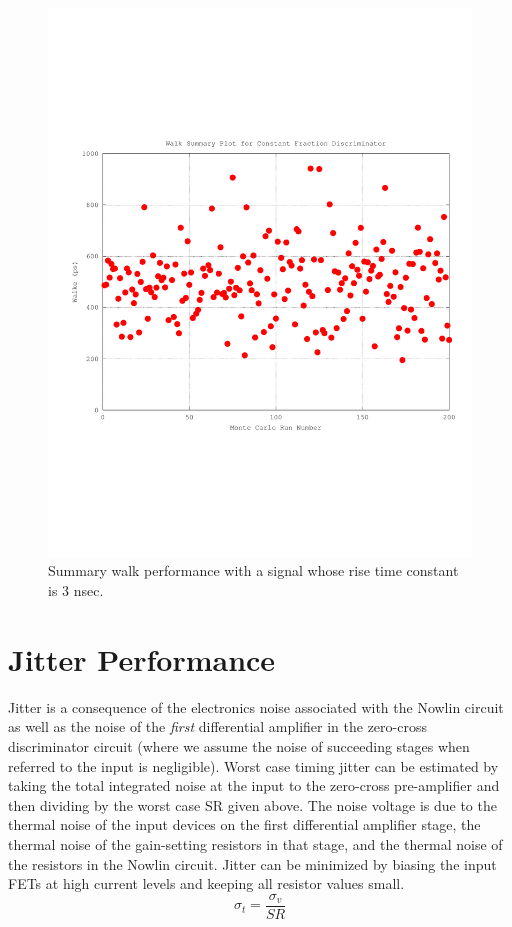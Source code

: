 \documentclass[12pt,oneside,final]{siuethesis}
\theoremstyle{definition}
\begin{document}
\begin{figure}[htbp!]
	\centering
 	\includegraphics[scale=0.8,keepaspectratio=true]{../Design_Reports/CFD_circuit_report/images/summary_walk.pdf} 	
 	\caption{Summary walk performance with a signal whose rise time constant is 3 nsec.}
 	\label{FIG:SUMMARY_WALK}
\end{figure}

\section{Jitter Performance}
\par Jitter is a consequence of the electronics noise associated with the Nowlin circuit as well as the noise of the \emph{first} differential amplifier in the zero-cross discriminator circuit (where we assume the noise of succeeding stages when referred to the input is negligible). Worst case timing jitter can be estimated by taking the total integrated noise at the input to the zero-cross pre-amplifier and then dividing by the worst case SR given above.  The noise voltage is due to the thermal noise of the input devices on the first differential amplifier stage, the thermal noise of the gain-setting resistors in that stage, and the thermal noise of the resistors in the Nowlin circuit.  Jitter can be minimized by biasing the input FETs at high current levels and keeping all resistor values small.
\begin{equation}
\sigma_t = \frac{\sigma_v}{SR}
\end{equation}
\end{document}
